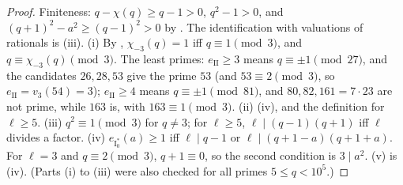 \begin{proof}
Finiteness: $q-\chi(q)\ge q-1>0$, $q^2-1>0$, and $(q+1)^2-a^2\ge(q-1)^2>0$ by . The identification with valuations of
rationals is (iii). (i) By , $\chi_{-3}(q)=1$ iff $q\equiv1\pmod3$, and $q\equiv\chi_{-3}(q)\pmod3$. The least primes:
$e_{\mathrm{II}}\ge3$ means $q\equiv\pm1\pmod{27}$, and the candidates $26,28,53$ give the prime $53$ (and $53\equiv2\pmod3$, so $e_{\mathrm{II}}=v_3(54)=3$); $e_{\mathrm{II}}\ge4$ means $q\equiv\pm1\pmod{81}$,
and $80,82,161=7\cdot23$ are not prime, while $163$ is, with $163\equiv1\pmod3$. (ii) (iv), and the definition for $\ell\ge5$.
(iii) $q^2\equiv1\pmod3$ for $q\ne3$; for $\ell\ge5$, $\ell\mid(q-1)(q+1)$ iff $\ell$ divides a factor. (iv) $e_{\mathrm{I}_0^*}(a)\ge1$ iff $\ell\mid q-1$ or $\ell\mid(q+1-a)(q+1+a)$. For $\ell=3$
and $q\equiv2\pmod3$, $q+1\equiv0$, so the second condition is $3\mid a^2$. (v) is (iv). (Parts (i) to (iii) were also checked for all
primes $5\le q<10^5$.)
\end{proof}

